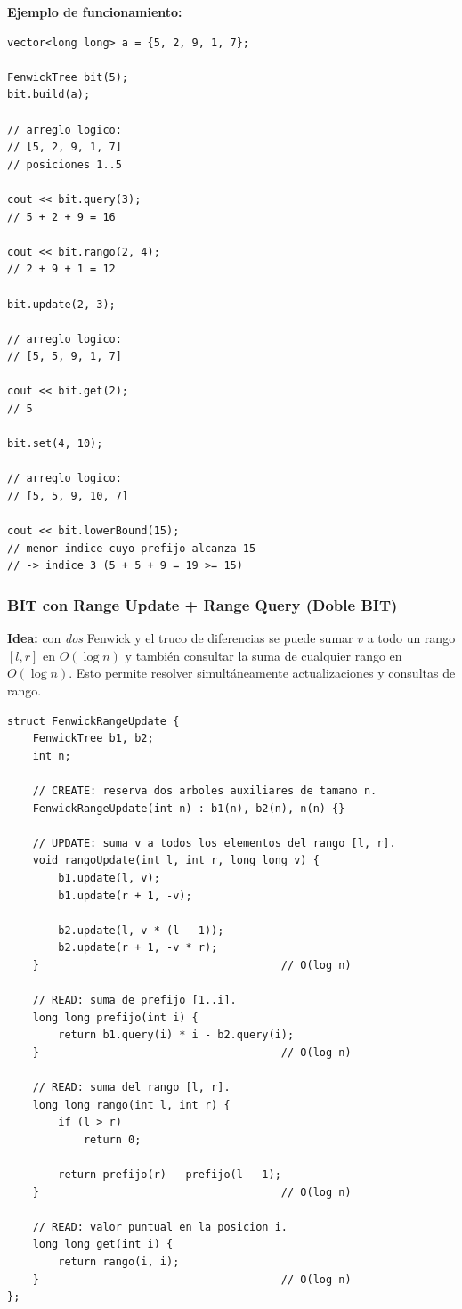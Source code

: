 \documentclass[10pt,a4paper,twocolumn]{article}
\begin{document}
\textbf{Ejemplo de funcionamiento:}

\begin{lstlisting}[style=cpp]
vector<long long> a = {5, 2, 9, 1, 7};

FenwickTree bit(5);
bit.build(a);

// arreglo logico:
// [5, 2, 9, 1, 7]
// posiciones 1..5

cout << bit.query(3);
// 5 + 2 + 9 = 16

cout << bit.rango(2, 4);
// 2 + 9 + 1 = 12

bit.update(2, 3);

// arreglo logico:
// [5, 5, 9, 1, 7]

cout << bit.get(2);
// 5

bit.set(4, 10);

// arreglo logico:
// [5, 5, 9, 10, 7]

cout << bit.lowerBound(15);
// menor indice cuyo prefijo alcanza 15
// -> indice 3 (5 + 5 + 9 = 19 >= 15)
\end{lstlisting}


\subsubsection{BIT con Range Update + Range Query (Doble BIT)}

\textbf{Idea:} con \emph{dos} Fenwick y el truco de diferencias se
puede sumar $v$ a todo un rango $[l,r]$ en $O(\log n)$ y también
consultar la suma de cualquier rango en $O(\log n)$. Esto permite
resolver simultáneamente actualizaciones y consultas de rango.

\begin{lstlisting}[style=cpp]
struct FenwickRangeUpdate {
    FenwickTree b1, b2;
    int n;

    // CREATE: reserva dos arboles auxiliares de tamano n.
    FenwickRangeUpdate(int n) : b1(n), b2(n), n(n) {}

    // UPDATE: suma v a todos los elementos del rango [l, r].
    void rangoUpdate(int l, int r, long long v) {
        b1.update(l, v);
        b1.update(r + 1, -v);

        b2.update(l, v * (l - 1));
        b2.update(r + 1, -v * r);
    }                                      // O(log n)

    // READ: suma de prefijo [1..i].
    long long prefijo(int i) {
        return b1.query(i) * i - b2.query(i);
    }                                      // O(log n)

    // READ: suma del rango [l, r].
    long long rango(int l, int r) {
        if (l > r)
            return 0;

        return prefijo(r) - prefijo(l - 1);
    }                                      // O(log n)

    // READ: valor puntual en la posicion i.
    long long get(int i) {
        return rango(i, i);
    }                                      // O(log n)
};
\end{lstlisting}
\end{document}
